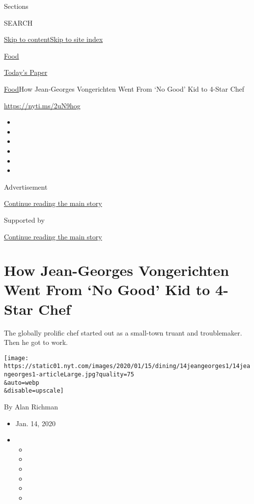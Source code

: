 Sections

SEARCH

\protect\hyperlink{site-content}{Skip to
content}\protect\hyperlink{site-index}{Skip to site index}

\href{https://www.nytimes.com/section/food}{Food}

\href{https://myaccount.nytimes.com/auth/login?response_type=cookie\&client_id=vi}{}

\href{https://www.nytimes.com/section/todayspaper}{Today's Paper}

\href{/section/food}{Food}\textbar{}How Jean-Georges Vongerichten Went
From `No Good' Kid to 4-Star Chef

\url{https://nyti.ms/2uN9hog}

\begin{itemize}
\item
\item
\item
\item
\item
\item
\end{itemize}

Advertisement

\protect\hyperlink{after-top}{Continue reading the main story}

Supported by

\protect\hyperlink{after-sponsor}{Continue reading the main story}

\hypertarget{how-jean-georges-vongerichten-went-from-no-good-kid-to-4-star-chef}{%
\section{How Jean-Georges Vongerichten Went From `No Good' Kid to 4-Star
Chef}\label{how-jean-georges-vongerichten-went-from-no-good-kid-to-4-star-chef}}

The globally prolific chef started out as a small-town truant and
troublemaker. Then he got to work.

\texttt{[image: https://static01.nyt.com/images/2020/01/15/dining/14jeangeorges1/14jeangeorges1-articleLarge.jpg?quality=75\\\&auto=webp\\\&disable=upscale]}

By Alan Richman

\begin{itemize}
\item
  Jan. 14, 2020
\item
  \begin{itemize}
  \item
  \item
  \item
  \item
  \item
  \item
  \end{itemize}
\end{itemize}

